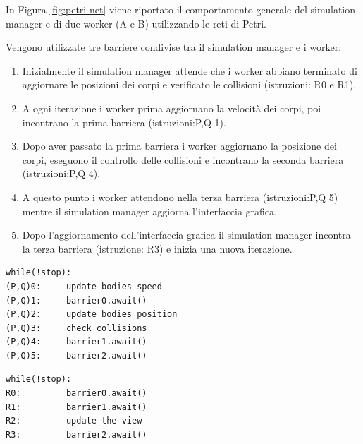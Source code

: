 \documentclass[12pt,a4paper,openright,twoside]{book}
\begin{document}
In Figura \ref{fig:petri-net} viene riportato il comportamento generale del simulation manager e di due worker (A e B) utilizzando 
le reti di Petri.

Vengono utilizzate tre barriere condivise tra il simulation manager e i worker:
\begin{enumerate}
	\item Inizialmente il simulation manager attende che i worker
	abbiano terminato di aggiornare le posizioni dei corpi
	e verificato le collisioni (istruzioni: R0 e R1).
	\item A ogni iterazione i worker prima aggiornano la velocità dei corpi,
	poi incontrano la prima barriera (istruzioni:P,Q 1).
	\item Dopo aver passato la prima barriera i worker aggiornano la posizione dei corpi,
	eseguono il controllo delle collisioni e incontrano la seconda barriera (istruzioni:P,Q 4).
	\item A questo punto i worker attendono nella terza barriera (istruzioni:P,Q 5) mentre il simulation
	manager aggiorna l'interfaccia grafica.
	\item Dopo l'aggiornamento dell'interfaccia grafica il simulation manager incontra
	la terza barriera (istruzione: R3) e inizia una nuova iterazione.

\newpage

\end{enumerate}
\begin{lstlisting}[label=lst:worker,caption=Pseudocodice del worker]
		while(!stop):
(P,Q)0:		update bodies speed
(P,Q)1:		barrier0.await()
(P,Q)2:		update bodies position
(P,Q)3:		check collisions
(P,Q)4:		barrier1.await()
(P,Q)5:		barrier2.await()
\end{lstlisting}

\begin{lstlisting}[label=lst:simulation_manager,caption=Pseudocodice del simulation manager]
		while(!stop):
R0:			barrier0.await()
R1:			barrier1.await()
R2:			update the view
R3:			barrier2.await()
\end{lstlisting}
\end{document}
